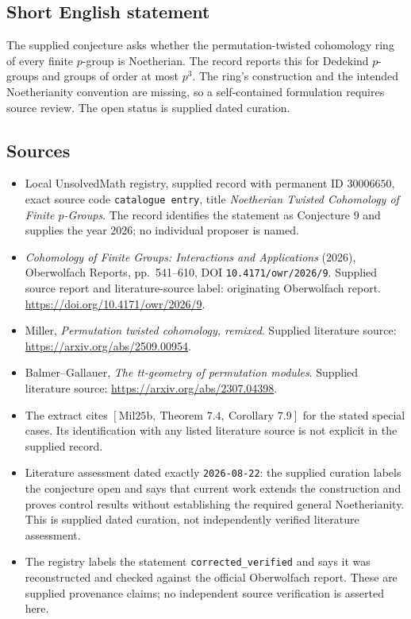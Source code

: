 \documentclass[11pt]{article}
\begin{document}
\subsection{Short English statement}
The supplied conjecture asks whether the permutation-twisted cohomology ring of every finite \(p\)-group is Noetherian. The record reports this for Dedekind \(p\)-groups and groups of order at most \(p^3\). The ring's construction and the intended Noetherianity convention are missing, so a self-contained formulation requires source review. The open status is supplied dated curation.
\subsection{Sources}
\begin{itemize}
\item Local UnsolvedMath registry, supplied record with permanent ID \(30006650\), exact source code \texttt{catalogue entry}, title \emph{Noetherian Twisted Cohomology of Finite \(p\)-Groups}. The record identifies the statement as Conjecture 9 and supplies the year 2026; no individual proposer is named.
\item \emph{Cohomology of Finite Groups: Interactions and Applications} (2026), Oberwolfach Reports, pp.~541--610, DOI \texttt{10.4171/owr/2026/9}. Supplied source report and literature-source label: originating Oberwolfach report. \url{https://doi.org/10.4171/owr/2026/9}.
\item Miller, \emph{Permutation twisted cohomology, remixed}. Supplied literature source: \url{https://arxiv.org/abs/2509.00954}.
\item Balmer--Gallauer, \emph{The tt-geometry of permutation modules}. Supplied literature source: \url{https://arxiv.org/abs/2307.04398}.
\item The extract cites \([\mathrm{Mil25b},\ \text{Theorem }7.4,\ \text{Corollary }7.9]\) for the stated special cases. Its identification with any listed literature source is not explicit in the supplied record.
\item Literature assessment dated exactly \texttt{2026-08-22}: the supplied curation labels the conjecture open and says that current work extends the construction and proves control results without establishing the required general Noetherianity. This is supplied dated curation, not independently verified literature assessment.
\item The registry labels the statement \texttt{corrected\_verified} and says it was reconstructed and checked against the official Oberwolfach report. These are supplied provenance claims; no independent source verification is asserted here.
\end{itemize}
\end{document}
